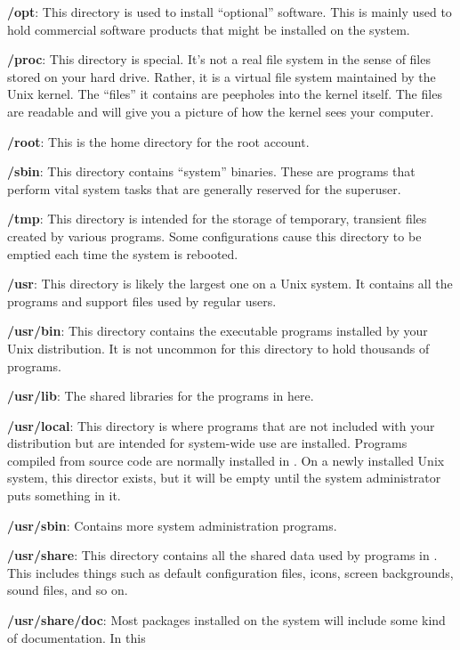 \item \textbf{/opt}: This directory is used to install ``optional'' software. This is mainly used to hold
commercial software products that might be installed on the system.
\item \textbf{/proc}: This directory is special. It's not a real file system in the sense of files stored on
your hard drive. Rather, it is a virtual file system maintained by the Unix kernel. The ``files'' it contains are
peepholes into the kernel itself. The files are readable and will give you a picture of how the kernel sees your
computer.
\item \textbf{/root}: This is the home directory for the root account.
\item \textbf{/sbin}: This directory contains ``system'' binaries. These are programs that perform vital system tasks
that are generally reserved for the superuser.
\item \textbf{/tmp}: This directory is intended for the storage of temporary, transient files created by various
programs. Some configurations cause this directory to be emptied each time the system is rebooted.
\item \textbf{/usr}: This directory is likely the largest one on a Unix system. It contains all the programs and support
files used by regular users.
\item \textbf{/usr/bin}: This directory contains the executable programs installed by your Unix distribution. It is not
uncommon for this directory to hold thousands of programs.
\item \textbf{/usr/lib}: The shared libraries for the programs in here.
\item \textbf{/usr/local}: This directory is where programs that are not included with your distribution but are
intended for system-wide use are installed. Programs compiled from source code are normally installed in
. On a newly installed Unix system, this director exists, but it will be empty until the system
administrator puts something in it.
\item \textbf{/usr/sbin}: Contains more system administration programs.
\item \textbf{/usr/share}: This directory contains all the shared data used by programs in . This
includes things such as default configuration files, icons, screen backgrounds, sound files, and so on.
\item \textbf{/usr/share/doc}: Most packages installed on the system will include some kind of documentation. In this
